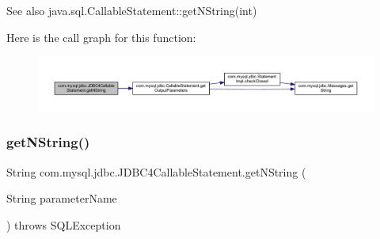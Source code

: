 \begin{DoxySeeAlso}{See also}
java.\+sql.\+Callable\+Statement\+::get\+N\+String(int) 
\end{DoxySeeAlso}
Here is the call graph for this function\+:
\nopagebreak
\begin{figure}[H]
\begin{center}
\leavevmode
\includegraphics[width=350pt]{classcom_1_1mysql_1_1jdbc_1_1_j_d_b_c4_callable_statement_a76edc16d913bef376e7262364251feb4_cgraph}
\end{center}
\end{figure}
\mbox{\label{classcom_1_1mysql_1_1jdbc_1_1_j_d_b_c4_callable_statement_ad92f78a50282fcf768519d0603c7a1ce}} 
\subsubsection{\texorpdfstring{get\+N\+String()}{getNString()}\hspace{0.1cm}{\footnotesize\ttfamily [2/2]}}
{\footnotesize\ttfamily String com.\+mysql.\+jdbc.\+J\+D\+B\+C4\+Callable\+Statement.\+get\+N\+String (\begin{DoxyParamCaption}\item[{String}]{parameter\+Name }\end{DoxyParamCaption}) throws S\+Q\+L\+Exception}

